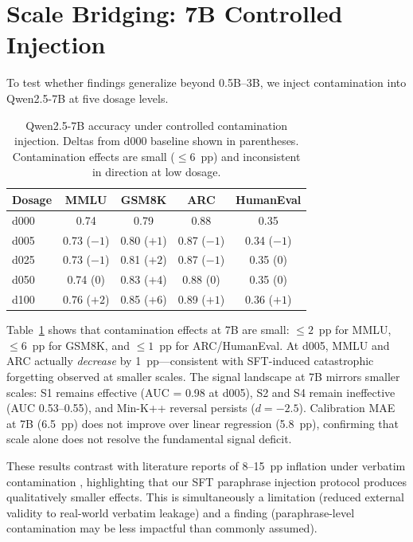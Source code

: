 \documentclass[11pt]{article}
\begin{document}
\section{Scale Bridging: 7B Controlled Injection}
\label{sec:7b}

To test whether findings generalize beyond 0.5B--3B, we inject contamination into Qwen2.5-7B at five dosage levels.

\begin{table}[t]
\centering
\caption{Qwen2.5-7B accuracy under controlled contamination injection.
Deltas from d000 baseline shown in parentheses.
Contamination effects are small ($\leq$6~pp) and inconsistent in direction at low dosage.}
\label{tab:7b}
\small
\begin{tabular}{lcccc}
\toprule
Dosage & MMLU & GSM8K & ARC & HumanEval \\
\midrule
d000 & 0.74 & 0.79 & 0.88 & 0.35 \\
d005 & 0.73 ($-1$) & 0.80 ($+1$) & 0.87 ($-1$) & 0.34 ($-1$) \\
d025 & 0.73 ($-1$) & 0.81 ($+2$) & 0.87 ($-1$) & 0.35 ($0$) \\
d050 & 0.74 ($0$) & 0.83 ($+4$) & 0.88 ($0$) & 0.35 ($0$) \\
d100 & 0.76 ($+2$) & 0.85 ($+6$) & 0.89 ($+1$) & 0.36 ($+1$) \\
\bottomrule
\end{tabular}
\end{table}

Table~\ref{tab:7b} shows that contamination effects at 7B are small: $\leq 2$~pp for MMLU, $\leq 6$~pp for GSM8K, and $\leq 1$~pp for ARC/HumanEval.
At d005, MMLU and ARC actually \emph{decrease} by 1~pp---consistent with SFT-induced catastrophic forgetting observed at smaller scales.
The signal landscape at 7B mirrors smaller scales: S1 remains effective (AUC = 0.98 at d005), S2 and S4 remain ineffective (AUC 0.53--0.55), and Min-K++ reversal persists ($d = -2.5$).
Calibration MAE at 7B (6.5~pp) does not improve over linear regression (5.8~pp), confirming that scale alone does not resolve the fundamental signal deficit.

These results contrast with literature reports of 8--15~pp inflation under verbatim contamination \citep{yang2023rethinking}, highlighting that our SFT paraphrase injection protocol produces qualitatively smaller effects.
This is simultaneously a limitation (reduced external validity to real-world verbatim leakage) and a finding (paraphrase-level contamination may be less impactful than commonly assumed).
\end{document}
